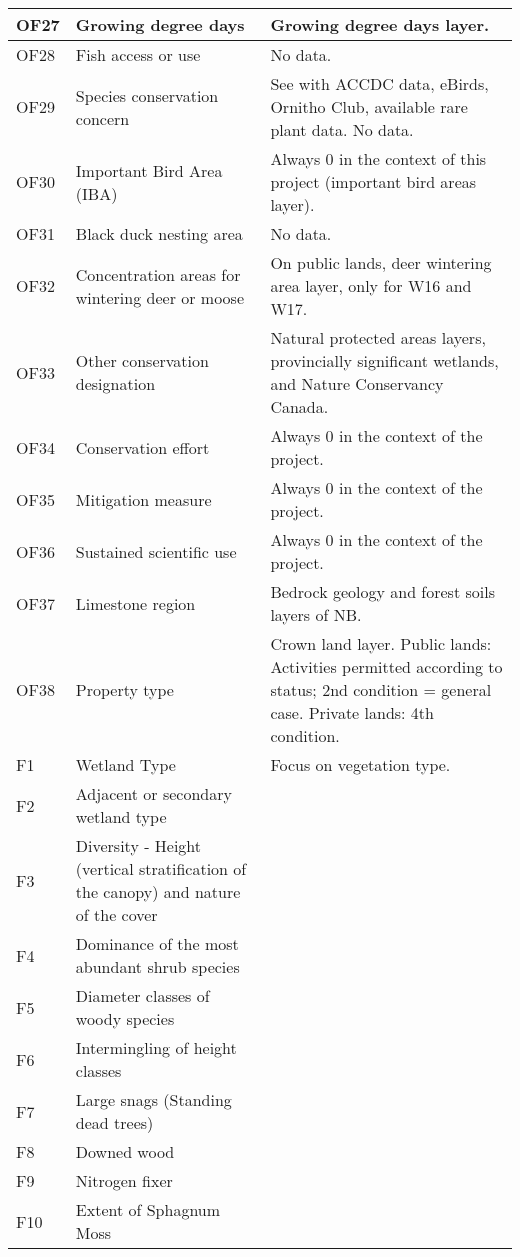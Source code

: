 \begin{longtable}{|l|p{3cm}|p{10cm}|}
    OF27 & Growing degree days & Growing degree days layer. \\ \hline
    OF28 & Fish access or use & No data. \\ \hline
    OF29 & Species conservation concern & See with ACCDC data, eBirds, Ornitho Club, available rare plant data. No data. \\ \hline
    OF30 & Important Bird Area (IBA) & Always 0 in the context of this project (important bird areas layer). \\ \hline
    OF31 & Black duck nesting area & No data. \\ \hline
    OF32 & Concentration areas for wintering deer or moose & On public lands, deer wintering area layer, only for W16 and W17. \\ \hline
    OF33 & Other conservation designation & Natural protected areas layers, provincially significant wetlands, and Nature Conservancy Canada. \\ \hline
    OF34 & Conservation effort & Always 0 in the context of the project. \\ \hline
    OF35 & Mitigation measure & Always 0 in the context of the project. \\ \hline
    OF36 & Sustained scientific use & Always 0 in the context of the project. \\ \hline
    OF37 & Limestone region & Bedrock geology and forest soils layers of NB. \\ \hline
    OF38 & Property type & Crown land layer. Public lands: Activities permitted according to status; 2nd condition = general case. Private lands: 4th condition. \\ \hline
    F1 & Wetland Type & Focus on vegetation type. \\ \hline
    F2 & Adjacent or secondary wetland type & \\ \hline
    F3 & Diversity - Height (vertical stratification of the canopy) and nature of the cover & \\ \hline
    F4 & Dominance of the most abundant shrub species & \\ \hline
    F5 & Diameter classes of woody species & \\ \hline
    F6 & Intermingling of height classes & \\ \hline
    F7 & Large snags (Standing dead trees) & \\ \hline
    F8 & Downed wood & \\ \hline
    F9 & Nitrogen fixer & \\ \hline
    F10 & Extent of Sphagnum Moss & \\ \hline

\end{longtable}
